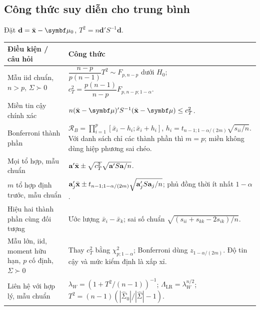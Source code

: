 \subsection{Công thức suy diễn cho trung bình}
Đặt $\mathbf d=\xbar-\vmu_0$, $T^2=n\mathbf d'S^{-1}\mathbf d$.
\begin{longtable}{L{.28\linewidth}L{.63\linewidth}}
\toprule
Điều kiện / câu hỏi & Công thức\\
\midrule
\endhead
Mẫu iid chuẩn, $n>p$, $\Sigma\succ0$ &
$\dfrac{n-p}{p(n-1)}T^2\sim F_{p,n-p}$ dưới $H_0$;
$c_T^2=\dfrac{p(n-1)}{n-p}F_{p,n-p;1-\alpha}$.\\[5pt]
Miền tin cậy chính xác & $n(\xbar-\vmu)'S^{-1}(\xbar-\vmu)\le c_T^2$.\\[4pt]
Bonferroni thành phần & $\mathcal R_B=\prod_{i=1}^p
[\bar x_i-h_i;\bar x_i+h_i]$, $h_i=t_{n-1;1-\alpha/(2m)}\sqrt{s_{ii}/n}$.
Với danh sách chỉ các thành phần thì $m=p$;
miền không dùng hiệp phương sai chéo.\\[4pt]
Mọi tổ hợp, mẫu chuẩn & $\mathbf a'\bar{\mathbf x}\pm\sqrt{c_T^2}\sqrt{\mathbf a'S\mathbf a/n}$.\\[4pt]
$m$ tổ hợp định trước, mẫu chuẩn & $\mathbf a_j'\bar{\mathbf x}\pm
t_{n-1;1-\alpha/(2m)}\sqrt{\mathbf a_j'S\mathbf a_j/n}$;
phủ đồng thời ít nhất $1-\alpha$.\\[4pt]
Hiệu hai thành phần cùng đối tượng & Ước lượng $\bar x_i-\bar x_k$;
sai số chuẩn $\sqrt{(s_{ii}+s_{kk}-2s_{ik})/n}$.\\[4pt]
Mẫu lớn, iid, moment hữu hạn, $p$ cố định, $\Sigma\succ0$ & Thay $c_T^2$ bằng
$\chi^2_{p;1-\alpha}$; Bonferroni dùng $z_{1-\alpha/(2m)}$.
Độ tin cậy và mức kiểm định là xấp xỉ.\\[4pt]
Liên hệ với hợp lý, mẫu chuẩn & $\lambda_W=(1+T^2/(n-1))^{-1}$;
$\Lambda_{\mathrm{LR}}=\lambda_W^{n/2}$;
$T^2=(n-1)(|\widehat\Sigma_0|/|\widehat\Sigma|-1)$.\\
\bottomrule
\end{longtable}

